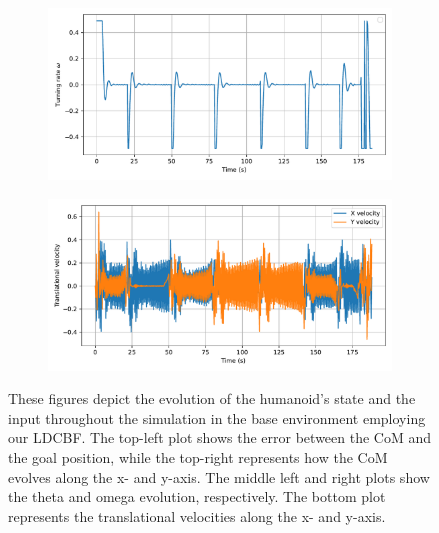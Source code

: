 \begin{figure}[H]
\begin{subfigure}{0.45\linewidth}
    \end{subfigure}
    \begin{subfigure}{0.45\linewidth}
        \centering
        \includegraphics[width=\linewidth]{figures/Simulations/sim_rrt/evolution_3.pdf}
    \end{subfigure}
    \hfill
    \begin{subfigure}{0.45\linewidth}
        \centering
        \includegraphics[width=\linewidth]{figures/Simulations/sim_rrt/evolution_1.pdf}
    \end{subfigure}
    \caption{These figures depict the evolution of the humanoid's state and the input throughout the simulation in the base environment employing our LDCBF. The top-left plot shows the error between the CoM and the goal position, while the top-right represents how the CoM evolves along the x- and y-axis. The middle left and right plots show the theta and omega evolution, respectively. The bottom plot represents the translational velocities along the x- and y-axis.}
    \label{fig:sim_rrt_evol}
\end{figure}




